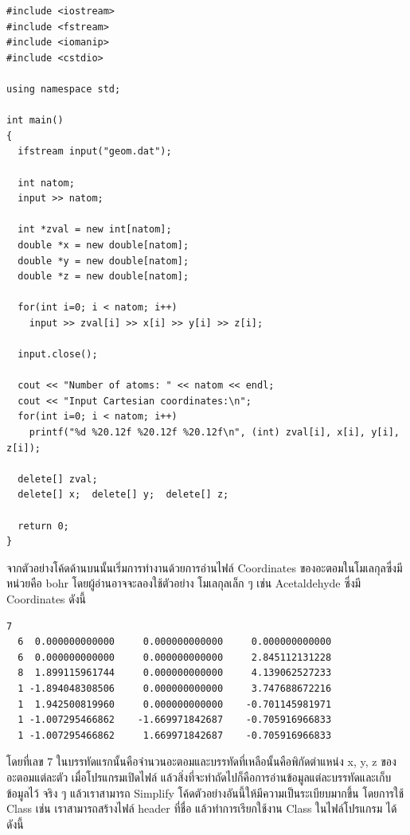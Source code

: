 \begin{lstlisting}[style=MyC++]
#include <iostream>
#include <fstream>
#include <iomanip>
#include <cstdio>

using namespace std;

int main() 
{
  ifstream input("geom.dat");

  int natom;
  input >> natom;

  int *zval = new int[natom];
  double *x = new double[natom];
  double *y = new double[natom];
  double *z = new double[natom];

  for(int i=0; i < natom; i++)
    input >> zval[i] >> x[i] >> y[i] >> z[i];
  
  input.close();

  cout << "Number of atoms: " << natom << endl;
  cout << "Input Cartesian coordinates:\n";
  for(int i=0; i < natom; i++)
    printf("%d %20.12f %20.12f %20.12f\n", (int) zval[i], x[i], y[i], z[i]);

  delete[] zval;
  delete[] x;  delete[] y;  delete[] z;

  return 0;
}
\end{lstlisting}

\vspace{5pt}

จากตัวอย่างโค้ดด้านบนนั้นเริ่มการทำงานด้วยการอ่านไฟล์ Coordinates ของอะตอมในโมเลกุลซึ่งมีหน่วยคือ bohr โดยผู้อ่านอาจจะลองใช้ตัวอย่าง%
โมเลกุลเล็ก ๆ เช่น Acetaldehyde ซึ่งมี Coordinates ดังนี้

\begin{Verbatim}[frame=single]
  7
  6  0.000000000000     0.000000000000     0.000000000000
  6  0.000000000000     0.000000000000     2.845112131228
  8  1.899115961744     0.000000000000     4.139062527233
  1 -1.894048308506     0.000000000000     3.747688672216
  1  1.942500819960     0.000000000000    -0.701145981971
  1 -1.007295466862    -1.669971842687    -0.705916966833
  1 -1.007295466862     1.669971842687    -0.705916966833
\end{Verbatim}

\noindent โดยที่เลข 7 ในบรรทัดแรกนั้นคือจำนวนอะตอมและบรรทัดที่เหลือนั้นคือพิกัดตำแหน่ง x, y, z ของอะตอมแต่ละตัว เมื่อโปรแกรมเปิดไฟล์%
แล้วสิ่งที่จะทำถัดไปก็คือการอ่านข้อมูลแต่ละบรรทัดและเก็บข้อมูลไว้ จริง ๆ แล้วเราสามารถ Simplify โค้ดตัวอย่างอันนี้ให้มีความเป็นระเบียบมากขึ้น%
โดยการใช้ Class เช่น เราสามารถสร้างไฟล์ header ที่ชื่อ  แล้วทำการเรียกใช้งาน Class ในไฟล์โปรแกรม
 ได้ดังนี้

\vspace{5pt}

